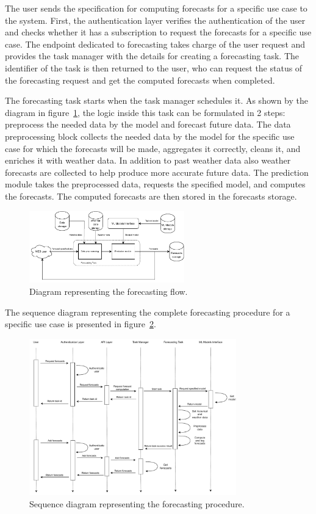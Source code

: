 The user sends the specification for computing forecasts for a specific use case to the system.
First, the authentication layer verifies the authentication of the user and checks whether it has a subscription to request the forecasts for a specific use case.
The endpoint dedicated to forecasting takes charge of the user request and provides the task manager with the details for creating a forecasting task.
The identifier of the task is then returned to the user, who can request the status of the forecasting request and get the computed forecasts when completed.

The forecasting task starts when the task manager schedules it.
As shown by the diagram in figure~\ref{fig:forecastflow}, the logic inside this task can be formulated in 2 steps: preprocess the needed data by the model and forecast future data.
The data preprocessing block collects the needed data by the model for the specific use case for which the forecasts will be made, aggregates it correctly, cleans it, and enriches it with weather data. In addition to past weather data also weather forecasts are collected to help produce more accurate future data.
The prediction module takes the preprocessed data, requests the specified model, and computes the forecasts.
The computed forecasts are then stored in the forecasts storage.

\begin{figure}[H]
\centering
\includegraphics[width=0.6\textwidth]{images/architecture_forecasting_flow}
\caption{Diagram representing the forecasting flow.}
\label{fig:forecastflow}
\end{figure}

The sequence diagram representing the complete forecasting procedure for a specific use case is presented in figure~\ref{fig:forecastingsequence}.

\begin{figure}[H]
\centering
\includegraphics[width=0.8\textwidth]{images/architecture_forecasting_sequence}
\caption{Sequence diagram representing the forecasting procedure.}
\label{fig:forecastingsequence}
\end{figure}



